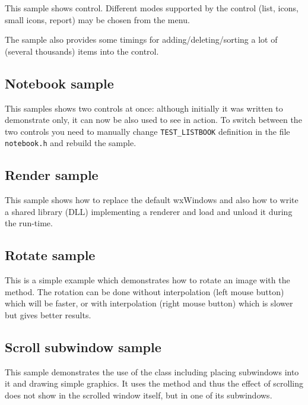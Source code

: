This sample shows  control. Different modes
supported by the control (list, icons, small icons, report) may be chosen from
the menu.

The sample also provides some timings for adding/deleting/sorting a lot of
(several thousands) items into the control.



\subsection{Notebook sample}\label{samplenotebook}

This samples shows two controls at once: although initially it was written to
demonstrate  only, it can now be also used
to see  in action. To switch between the two
controls you need to manually change \texttt{TEST\_LISTBOOK} definition in the
file \texttt{notebook.h} and rebuild the sample.



\subsection{Render sample}\label{samplerender}

This sample shows how to replace the default wxWindows 
 and also how to write a shared library
(DLL) implementing a renderer and load and unload it during the run-time.



\subsection{Rotate sample}\label{samplerotate}

This is a simple example which demonstrates how to rotate an image with
the  method. The rotation can
be done without interpolation (left mouse button) which will be faster,
or with interpolation (right mouse button) which is slower but gives
better results.


\subsection{Scroll subwindow sample}\label{samplescrollsub}

This sample demonstrates the use of the  
class including placing subwindows into it and drawing simple graphics. It uses the 
 method and thus the effect
of scrolling does not show in the scrolled window itself, but in one of its subwindows.

